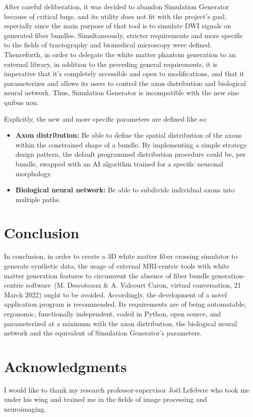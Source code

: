 \documentclass{article}
\begin{document}
  After careful deliberation, it was decided to abandon Simulation Generator because of critical bugs, and its utility does not fit with the project's goal, especially since the main purpose of that tool is to simulate DWI signals on generated fiber bundles.
  Simultaneously, stricter requirements and more specific to the fields of tractography and biomedical microscopy were defined.
  Thenceforth, in order to delegate the white matter phantom generation to an external library, in addition to the preceding general requirements, it is imperative that it's completely accessible and open to modifications, and that it parameterizes and allows its users to control the axon distribution and biological neural network.
  Thus, Simulation Generator is incompatible with the new sine quibus non.

  Explicitly, the new and more specific parameters are defined like so:
  \begin{itemize}
    \item \textbf{Axon distribution:} Be able to define the spatial distribution of the axons within the constrained shape of a bundle.
    By implementing a simple strategy design pattern, the default programmed distribution procedure could be, per bundle, swapped with an AI algorithm trained for a specific neuronal morphology.
    \item \textbf{Biological neural network:} Be able to subdivide individual axons into multiple paths.
  \end{itemize}


  \section{Conclusion}\label{sec:conclusion}

  In conclusion, in order to create a 3D white matter fiber crossing simulator to generate synthetic data, the usage of external MRI-centric tools with white matter generation features to circumvent the absence of fiber bundle generation-centric software~\nocite{descoteauxvalcourtcaron2022othertoolsthanfiberfox}(M. Descoteaux \& A. Valcourt Caron, virtual conversation, 21 March 2022) ought to be avoided.
  Accordingly, the development of a novel application program is recommended.
  Its requirements are of being automatable, ergonomic, functionally independent, coded in Python, open source, and parameterized at a minimum with the axon distribution, the biological neural network and the equivalent of Simulation Generator's parameters.


  \section*{Acknowledgments}\label{sec:thanks}

  I would like to thank my research professor-supervisor Joël Lefebvre who took me under his wing and trained me in the fields of image processing and neuroimaging.


  
  
\end{document}
